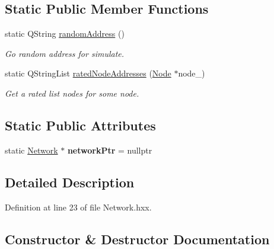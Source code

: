 \subsection*{Static Public Member Functions}
\begin{DoxyCompactItemize}
\item 
\mbox{\label{classeven_1_1_network_a320099898b0dc3d09c29705c6430e1e0}} 
static Q\+String \mbox{\hyperlink{classeven_1_1_network_a320099898b0dc3d09c29705c6430e1e0}{random\+Address}} ()
\begin{DoxyCompactList}\small\item\em Go random address for simulate. \end{DoxyCompactList}\item 
\mbox{\label{classeven_1_1_network_a34efd0e195b1c2dea9d65226595f1c21}} 
static Q\+String\+List \mbox{\hyperlink{classeven_1_1_network_a34efd0e195b1c2dea9d65226595f1c21}{rated\+Node\+Addresses}} (\mbox{\hyperlink{classeven_1_1_node}{Node}} $\ast$node\+\_\+)
\begin{DoxyCompactList}\small\item\em Get a rated list nodes for some node. \end{DoxyCompactList}\end{DoxyCompactItemize}
\subsection*{Static Public Attributes}
\begin{DoxyCompactItemize}
\item 
\mbox{\label{classeven_1_1_network_a4648263f10924d6fd6ab264caaf4a955}} 
static \mbox{\hyperlink{classeven_1_1_network}{Network}} $\ast$ {\bfseries network\+Ptr} = nullptr
\end{DoxyCompactItemize}


\subsection{Detailed Description}


Definition at line 23 of file Network.\+hxx.



\subsection{Constructor \& Destructor Documentation}
\mbox{\label{classeven_1_1_network_a3cc2fb4f8fa4d507077e8da85ce5a1c8}} 
